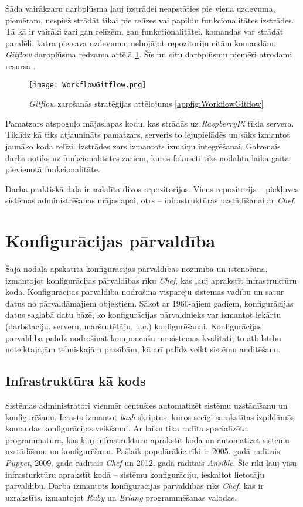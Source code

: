 Šāda vairākzaru darbplūsma ļauj izstrādei neapstāties pie viena uzdevuma, piemēram, nespiež strādāt tikai pie relīzes vai papildu funkcionalitātes izstrādes. Tā kā ir vairāki zari gan relīzēm, gan funkctionalitātei, komandas var strādāt paralēli, katra pie sava uzdevuma, nebojājot repozitoriju citām komandām.
 \textit{Gitflow} darbplūsma redzama attēlā \ref{fig:WorkflowGitflow}. Šīs un citu darbplūsmu piemēri atrodami resursā \cite[Gitflow Workflow]{workflow-comparison}.
\begin{figure}[H]%
	\centering
	\captionsetup{justification=centering}
	\texttt{[image: WorkflowGitflow.png]}
	\caption{\textit{Gitflow} zarošanās stratēģijas attēlojums \ref{appfig:WorkflowGitflow}}
	\label{fig:WorkflowGitflow}
\end{figure}
Pamatzars atspoguļo mājaslapas kodu, kas strādās uz \textit{RaspberryPi} tīkla servera. Tiklīdz kā tiks atjaunināts pamatzars, serveris to lejupielādēs un sāks izmantot jaunāko koda relīzi.
Izstrādes zars izmantots izmaiņu integrēšanai.
Galvenais darbs notiks uz funkcionalitātes zariem, kuros fokusēti tiks nodalīta laika gaitā pievienotā funkcionalitāte.



Darba praktiskā daļa ir sadalīta divos repozitorijos. Viens repozitorijs -- piekļuves sistēmas administrēšanas mājaslapai, otrs -- infrastruktūras uzstādīšanai ar \textit{Chef}.

\chapter{Konfigurācijas pārvaldība}
Šajā nodaļā apskatīta konfigurācijas pārvaldības nozīmība un īstenošana, izmantojot konfigurācijas pārvaldības rīku \textit{Chef}, kas ļauj aprakstīt infrastruktūru kodā.
Konfigurācijas pārvaldība nodrošina vispārēju sistēmas vadību un satur datus no pārvaldāmajiem objektiem. Sākot ar 1960-ajiem gadiem, konfigurācijas datus saglabā datu bāzē, ko konfigurācijas pārvaldnieks var izmantot iekārtu (darbstaciju, serveru, maršrutētāju, u.c.) konfigurēšanai.
Konfigurācijas pārvaldība palīdz nodrošināt komponenšu un sistēmas kvalitāti, to atbilstību noteiktajajām tehniskajām prasībām, kā arī palīdz veikt sistēmu auditēšanu.

\section{Infrastruktūra kā kods}
Sistēmas administratori vienmēr centušies automatizēt sistēmu uzstādīšanu un konfigurēšanu. Ierasts izmantot \textit{bash} skriptus, kuros secīgi sarakstītas izpildāmās komandas konfigurācijas veikšanai. Ar laiku tika radīta specializēta programmatūra, kas ļauj infrastruktūru aprakstīt kodā un automatizēt sistēmu uzstādīšanu un konfigurēšanu. Pašlaik populārākie rīki ir 2005. gadā radītais \textit{Puppet}, 2009. gadā radītais \textit{Chef} un 2012. gadā radītais \textit{Ansible}. Šie rīki ļauj visu infrasturktūru aprakstīt kodā -- sistēmu konfigurāciju, ieskaitot lietotāju pārvaldību. Darbā izmantots konfigurācijas pārvaldības rīks \textit{Chef}, kas ir uzrakstīts, izmantojot \textit{Ruby} un \textit{Erlang} programmēšanas valodas.

